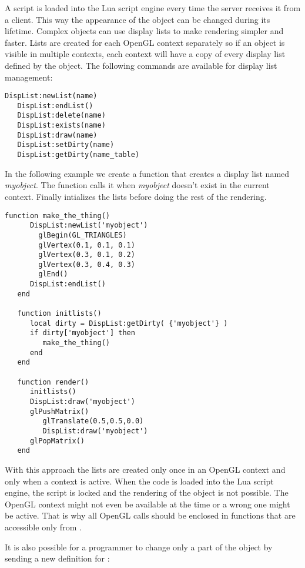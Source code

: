 A script is loaded into the Lua script engine every time the server receives it
from a client. This way the appearance of the object can be changed during its
lifetime. Complex objects can use display lists to make rendering simpler and 
faster. Lists are created for each OpenGL context separately so if an object
is visible in multiple contexts, each context will have a copy of every
display list defined by the object.
The following commands are available for display list management:

\begin{Verbatim}[fontsize=\scriptsize,gobble=3]
   DispList:newList(name)
   DispList:endList()
   DispList:delete(name)
   DispList:exists(name)
   DispList:draw(name)
   DispList:setDirty(name)
   DispList:getDirty(name_table)
\end{Verbatim}

In the following example we create a function that creates a display list named
{\em myobject}. The function  calls it when {\em myobject}
doesn't exist in the current context. Finally  intializes the
lists before doing the rest of the rendering.

\begin{Verbatim}[fontsize=\scriptsize,gobble=3]
   function make_the_thing()
      DispList:newList('myobject')
        glBegin(GL_TRIANGLES)
        glVertex(0.1, 0.1, 0.1)
        glVertex(0.3, 0.1, 0.2)
        glVertex(0.3, 0.4, 0.3)
        glEnd()
      DispList:endList()
   end

   function initlists()
      local dirty = DispList:getDirty( {'myobject'} )
      if dirty['myobject'] then
         make_the_thing()
      end
   end

   function render()
      initlists()
      DispList:draw('myobject')
      glPushMatrix()
         glTranslate(0.5,0.5,0.0)
         DispList:draw('myobject')
      glPopMatrix()
   end
\end{Verbatim}

With this approach the lists are created only once in an OpenGL context and
only when a context is active. When the code is loaded into the Lua script
engine, the script is locked and the rendering of the object is not possible.
The OpenGL context might not even be available at the time or a wrong one might
be active. That is why all OpenGL calls should be enclosed in functions that
are accessible only from .

It is also possible for a programmer to change only a part of the object by
sending a new definition for :

